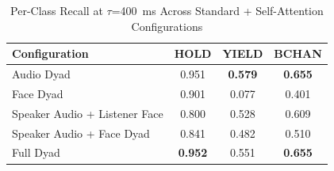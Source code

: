 \begin{table}[h]
\caption{Per-Class Recall at $\tau$=400~ms Across Standard + Self-Attention Configurations}
\label{tab:recall_per_class_ssa}
\small
\renewcommand{\arraystretch}{1.20}
\begin{tabular}{>{\raggedright\arraybackslash}p{4cm}ccc}
\toprule
Configuration & HOLD & YIELD & BCHAN \\
\midrule
Audio Dyad & 0.951 & \textbf{0.579} & \textbf{0.655} \\
Face Dyad & 0.901 & 0.077 & 0.401 \\
Speaker Audio + Listener Face & 0.800 & 0.528 & 0.609 \\
Speaker Audio + Face Dyad & 0.841 & 0.482 & 0.510 \\
Full Dyad & \textbf{0.952} & 0.551 & \textbf{0.655} \\
\bottomrule
\end{tabular}
\end{table}
